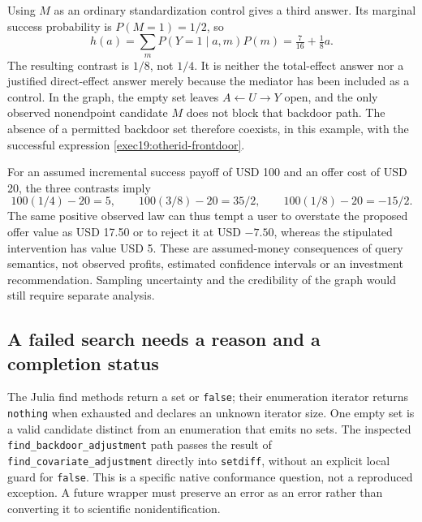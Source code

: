 Using $M$ as an ordinary standardization control gives a third answer. Its
marginal success probability is $P(M=1)=1/2$, so
\begin{equation}
 h(a)=\sum_m P(Y=1\mid a,m)P(m)=\tfrac7{16}+\tfrac18a.
 \label{exec19:otherid-standardization}
\end{equation}
The resulting contrast is $1/8$, not $1/4$. It is neither the total-effect
answer nor a justified direct-effect answer merely because the mediator has
been included as a control. In the graph, the empty set leaves
$A\leftarrow U\to Y$ open, and the only observed nonendpoint candidate $M$
does not block that backdoor path. The absence of a permitted backdoor set
therefore coexists, in this example, with the successful expression
\eqref{exec19:otherid-frontdoor}.\citep{exec19_otherid_reference}

For an assumed incremental success payoff of USD 100 and an offer cost of
USD 20, the three contrasts imply
\begin{equation}
 100(1/4)-20=5,\qquad
 100(3/8)-20=35/2,\qquad
 100(1/8)-20=-15/2.
 \label{exec19:otherid-money}
\end{equation}
The same positive observed law can thus tempt a user to overstate the proposed
offer value as USD 17.50 or to reject it at USD $-7.50$, whereas the stipulated
intervention has value USD 5. These are assumed-money consequences of query
semantics, not observed profits, estimated confidence intervals or an investment
recommendation. Sampling uncertainty and the credibility of the graph would
still require separate analysis.\citep{exec19_otherid_reference}

\subsection{A failed search needs a reason and a completion status}
\label{exec19:otherid-status}
The Julia find methods return a set or \texttt{false}; their enumeration
iterator returns \texttt{nothing} when exhausted and declares an unknown
iterator size. One empty set is a valid candidate distinct from an enumeration
that emits no sets. The inspected \texttt{find\_backdoor\_adjustment} path
passes the result of \texttt{find\_covariate\_adjustment} directly into
\texttt{setdiff}, without an explicit local guard for \texttt{false}. This
is a specific native conformance question, not a reproduced exception. A
future wrapper must preserve an error as an error rather than converting it
to scientific nonidentification.\citep{exec19_otherid_julia}

